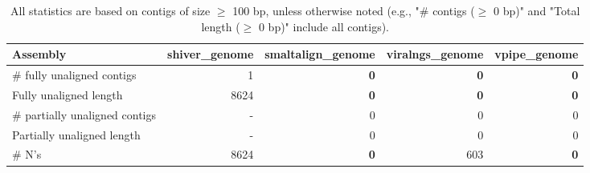 \documentclass[12pt,a4paper]{article}
\begin{document}
\begin{table}[ht]
\begin{center}
\caption{All statistics are based on contigs of size $\geq$ 100 bp, unless otherwise noted (e.g., "\# contigs ($\geq$ 0 bp)" and "Total length ($\geq$ 0 bp)" include all contigs).}
\begin{tabular}{|l*{4}{|r}|}
\hline
Assembly & shiver\_genome & smaltalign\_genome & viralngs\_genome & vpipe\_genome \\ \hline
\# fully unaligned contigs & 1 & {\bf 0} & {\bf 0} & {\bf 0} \\ \hline
Fully unaligned length & 8624 & {\bf 0} & {\bf 0} & {\bf 0} \\ \hline
\# partially unaligned contigs & - & 0 & 0 & 0 \\ \hline
Partially unaligned length & - & 0 & 0 & 0 \\ \hline
\# N's & 8624 & {\bf 0} & 603 & {\bf 0} \\ \hline
\end{tabular}
\end{center}
\end{table}
\end{document}
